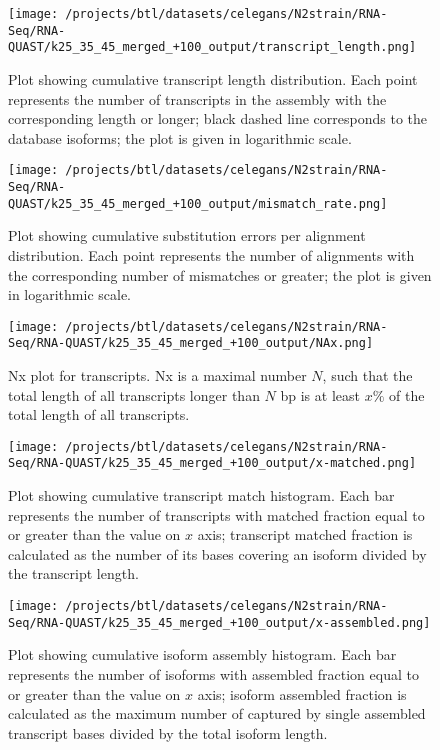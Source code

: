 \documentclass[12pt,a4paper]{article}
\begin{document}
\FloatBarrier
\clearpage
{}

\begin{figure}[t]
\centering
\texttt{[image: /projects/btl/datasets/celegans/N2strain/RNA-Seq/RNA-QUAST/k25\_35\_45\_merged\_+100\_output/transcript\_length.png]}
\caption{Plot showing cumulative transcript length distribution. Each point represents the number of transcripts in the assembly with the corresponding length or longer; black dashed line corresponds to the database isoforms; the plot is given in logarithmic scale.}
\end{figure}
\FloatBarrier
\clearpage


\begin{figure}[t]
\centering
\texttt{[image: /projects/btl/datasets/celegans/N2strain/RNA-Seq/RNA-QUAST/k25\_35\_45\_merged\_+100\_output/mismatch\_rate.png]}
\caption{Plot showing cumulative substitution errors per alignment distribution. Each point represents the number of alignments with the corresponding number of mismatches or greater; the plot is given in logarithmic scale.}
\end{figure}
\FloatBarrier
\clearpage


\begin{figure}[t]
\centering
\texttt{[image: /projects/btl/datasets/celegans/N2strain/RNA-Seq/RNA-QUAST/k25\_35\_45\_merged\_+100\_output/NAx.png]}
\caption{Nx plot for transcripts. Nx is a maximal number $N$, such that the total length of all transcripts longer than $N$ bp is at least $x\%$ of the total length of all transcripts.}
\end{figure}
\FloatBarrier
\clearpage


\begin{figure}[t]
\centering
\texttt{[image: /projects/btl/datasets/celegans/N2strain/RNA-Seq/RNA-QUAST/k25\_35\_45\_merged\_+100\_output/x-matched.png]}
\caption{Plot showing cumulative transcript match histogram. Each bar represents the number of transcripts with matched fraction equal to or greater than the value on $x$ axis; transcript matched fraction is calculated as the number of its bases covering an isoform divided by the transcript length.}
\end{figure}
\FloatBarrier
\clearpage


\begin{figure}[t]
\centering
\texttt{[image: /projects/btl/datasets/celegans/N2strain/RNA-Seq/RNA-QUAST/k25\_35\_45\_merged\_+100\_output/x-assembled.png]}
\caption{Plot showing cumulative isoform assembly histogram. Each bar represents the number of isoforms with assembled fraction equal to or greater than the value on $x$ axis; isoform assembled fraction is calculated as the maximum number of captured by single assembled transcript bases divided by the total isoform length.}
\end{figure}
\FloatBarrier
\clearpage
\end{document}
